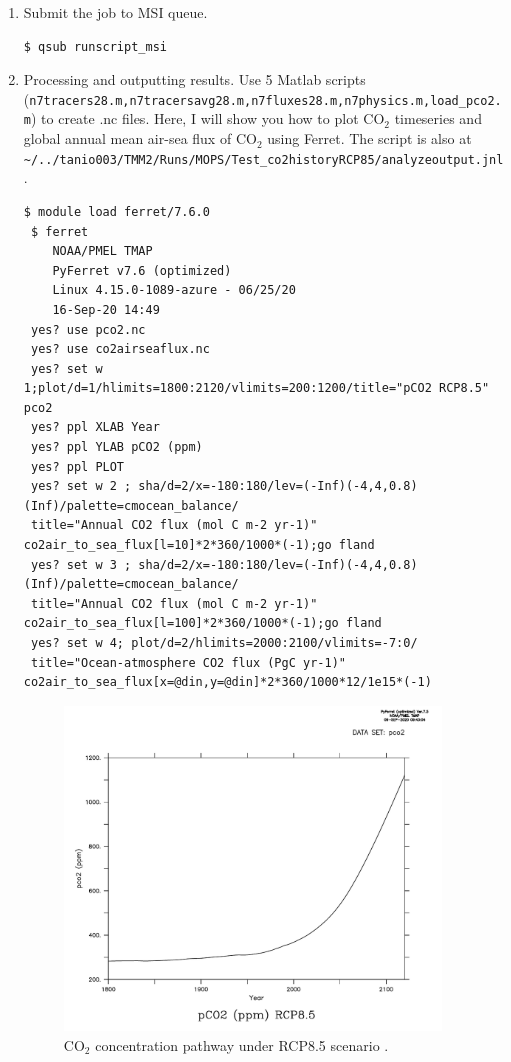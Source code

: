 \documentclass[a4paper]{article}
\begin{document}
\begin{enumerate}
\item Submit the job to MSI queue.
\begin{lstlisting}[style=DOS]
 $ qsub runscript_msi
\end{lstlisting}

\item Processing and outputting results. Use 5 Matlab scripts \\ (\verb|n7tracers28.m,n7tracersavg28.m,n7fluxes28.m,n7physics.m,load_pco2.m|) to create .nc files. Here, I will show you how to plot $\mathrm{CO_{2}}$ timeseries and global annual mean air-sea flux of $\mathrm{CO_{2}}$ using Ferret. The script is also at \verb|~/../tanio003/TMM2/Runs/MOPS/Test_co2historyRCP85/analyzeoutput.jnl|. 
\begin{lstlisting}[style=DOS]
 $ module load ferret/7.6.0
 $ ferret
  	NOAA/PMEL TMAP
 	PyFerret v7.6 (optimized)
 	Linux 4.15.0-1089-azure - 06/25/20
 	16-Sep-20 14:49
 yes? use pco2.nc
 yes? use co2airseaflux.nc
 yes? set w 1;plot/d=1/hlimits=1800:2120/vlimits=200:1200/title="pCO2 RCP8.5" pco2
 yes? ppl XLAB Year
 yes? ppl YLAB pCO2 (ppm)
 yes? ppl PLOT
 yes? set w 2 ; sha/d=2/x=-180:180/lev=(-Inf)(-4,4,0.8)(Inf)/palette=cmocean_balance/
 title="Annual CO2 flux (mol C m-2 yr-1)" co2air_to_sea_flux[l=10]*2*360/1000*(-1);go fland
 yes? set w 3 ; sha/d=2/x=-180:180/lev=(-Inf)(-4,4,0.8)(Inf)/palette=cmocean_balance/
 title="Annual CO2 flux (mol C m-2 yr-1)" co2air_to_sea_flux[l=100]*2*360/1000*(-1);go fland
 yes? set w 4; plot/d=2/hlimits=2000:2100/vlimits=-7:0/
 title="Ocean-atmosphere CO2 flux (PgC yr-1)" co2air_to_sea_flux[x=@din,y=@din]*2*360/1000*12/1e15*(-1)
\end{lstlisting}

\begin{figure}[b!]   %
   \centering
   \includegraphics[width=10cm]{pco2RCP85.pdf}
   \caption[]{$\mathrm{CO_2}$ concentration pathway under RCP8.5 scenario \citep{Meinshausen11}.}
   \label{fig:pco2RCP85}
\end{figure}


\end{enumerate}
\end{document}
